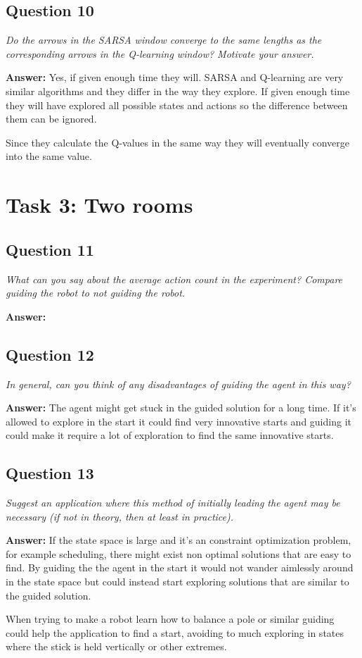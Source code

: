 \documentclass[a4paper]{article}
\begin{document}
\subsection*{Question 10}
\emph{Do the arrows in the SARSA window converge to the same
lengths as the corresponding arrows in the Q-learning window? Motivate your answer.}

\textbf{Answer:} Yes, if given enough time they will. SARSA and Q-learning are very similar algorithms and they differ in the way they explore. If given enough time they will have explored all possible states and actions so the difference between them can be ignored. 

Since they calculate the Q-values in the same way they will eventually converge into the same value.

\section{Task 3: Two rooms}

\subsection*{Question 11}
\emph{What can you say about the average action count in the experiment? Compare guiding the robot to not guiding the robot.}

\textbf{Answer:} 

\subsection*{Question 12}
\emph{In general, can you think of any disadvantages of guiding the
agent in this way?}

\textbf{Answer:} The agent might get stuck in the guided solution for a long time. If it's allowed to explore in the start it could find very innovative starts and guiding it could make it require a lot of exploration to find the same innovative starts. 

\subsection*{Question 13}
\emph{Suggest an application where this method of initially leading the
agent may be necessary (if not in theory, then at least in practice).}

\textbf{Answer:} If the state space is large and it's an constraint optimization problem, for example scheduling, there might exist non optimal solutions that are easy to find. By guiding the the agent in the start it would not wander aimlessly around in the state space but could instead start exploring solutions that are similar to the guided solution. 

When trying to make a robot learn how to balance a pole or similar guiding could help the application to find a start, avoiding to much exploring in states where the stick is held vertically or other extremes.
\end{document}
